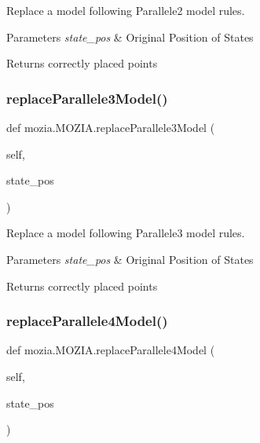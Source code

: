 Replace a model following Parallele2 model rules. 


\begin{DoxyParams}{Parameters}
{\em state\+\_\+pos} & Original Position of States \\
\hline
\end{DoxyParams}
\begin{DoxyReturn}{Returns}
correctly placed points 
\end{DoxyReturn}
\mbox{\label{classmozia_1_1MOZIA_a58e24c0db293f7bea6200ed8fb0b3bc2}} 
\subsubsection{\texorpdfstring{replaceParallele3Model()}{replaceParallele3Model()}}
{\footnotesize\ttfamily def mozia.\+M\+O\+Z\+I\+A.\+replace\+Parallele3\+Model (\begin{DoxyParamCaption}\item[{}]{self,  }\item[{}]{state\+\_\+pos }\end{DoxyParamCaption})}



Replace a model following Parallele3 model rules. 


\begin{DoxyParams}{Parameters}
{\em state\+\_\+pos} & Original Position of States \\
\hline
\end{DoxyParams}
\begin{DoxyReturn}{Returns}
correctly placed points 
\end{DoxyReturn}
\mbox{\label{classmozia_1_1MOZIA_a29aafaac93b9d4886b6d3a2ac8381e95}} 
\subsubsection{\texorpdfstring{replaceParallele4Model()}{replaceParallele4Model()}}
{\footnotesize\ttfamily def mozia.\+M\+O\+Z\+I\+A.\+replace\+Parallele4\+Model (\begin{DoxyParamCaption}\item[{}]{self,  }\item[{}]{state\+\_\+pos }\end{DoxyParamCaption})}



